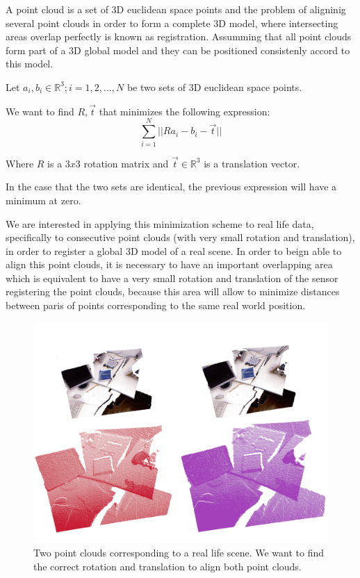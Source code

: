 

A point cloud is a set of 3D euclidean space points and the problem of aligninig several point clouds 
in order to form a complete 3D model, where intersecting areas overlap perfectly 
is known as registration. Assumming that all point clouds form part of a 3D global model and they can be 
 positioned  consistenly accord to this model.

Let  ${a_i},{b_i} \in \mathbb{R}^3;i = 1,2,...,N$ be two sets of 3D euclidean space points.

We want to find $R,\vec{t}$ that minimizes the following expression:
$$
\sum\limits_{i=1}^N || Ra_i - b_i - \vec{t} ||
$$

Where $R$ is a  $3x3$ rotation matrix and $\vec{t} \in \mathbb{R}^3$ is a translation vector.


In the case that the two sets are identical, the previous expression will have a minimum at zero.

We are interested in applying this minimization scheme to real life data, specifically to consecutive 
point clouds (with very small rotation and translation), in order to register a global 3D model of 
a real scene. In order to beign able to align this point clouds, it is necessary to have an important overlapping 
area which is equivalent to have a very small rotation and translation of the sensor registering the point clouds, 
because this area will allow to minimize distances between paris of points corresponding to the same real world position.


\begin{figure}[!h]
\begin{center}
\includegraphics[scale=0.35]{images/two_clouds}
\caption{Two point clouds corresponding to a real life scene. We want to find the correct rotation and translation to align both point clouds.}
\end{center}
\end{figure}


